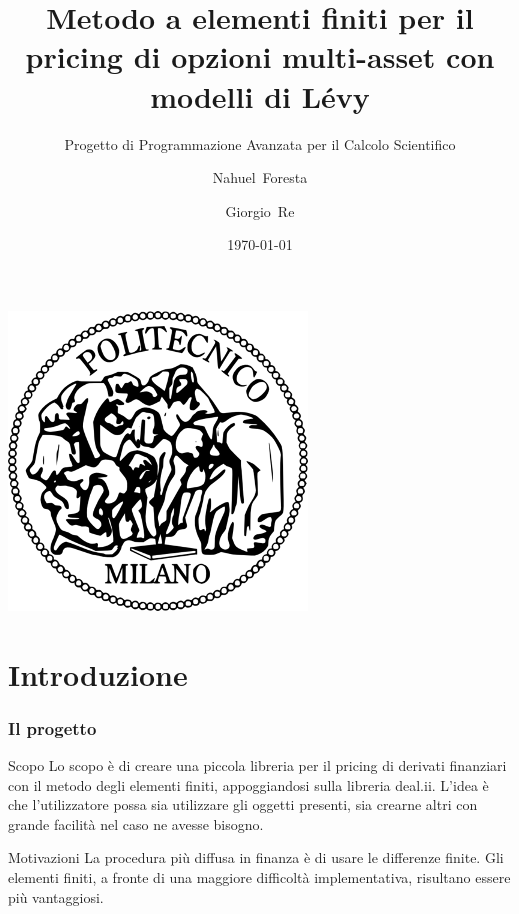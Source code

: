 \documentclass{beamer}
\title[PIDE pricing con elementi finiti] %
{Metodo a elementi finiti per il pricing di opzioni multi-asset con modelli di L\'evy}
\subtitle{Progetto di Programmazione Avanzata per il Calcolo Scientifico}
\author[Foresta, Re] %
{Nahuel~Foresta \and Giorgio~Re}
\institute[Politecnico di Milano]{Dipartimento di Matematica\\ \bf{Politecnico di Milano}} %
\date{\today}
\begin{document}

\begin{frame}
\centering
 \includegraphics[scale=0.2]{poli_logo}
 \maketitle
\end{frame}



\section{Introduzione}
\begin{frame}
\frametitle{Il progetto}
\begin{block}{Scopo}
Lo scopo è di creare una piccola libreria per il pricing di derivati finanziari con il metodo degli elementi finiti, appoggiandosi sulla libreria \textsf{deal.ii}.
L'idea è che l'utilizzatore possa sia utilizzare gli oggetti presenti, sia crearne altri con grande facilità nel caso ne avesse bisogno.
\end{block}
\pause
\begin{block}{Motivazioni}
La procedura pi\`u diffusa in finanza è di usare le differenze finite. Gli elementi finiti, a fronte di una maggiore difficoltà implementativa, risultano essere più vantaggiosi.
\end{block}
\end{frame}
\end{document}
